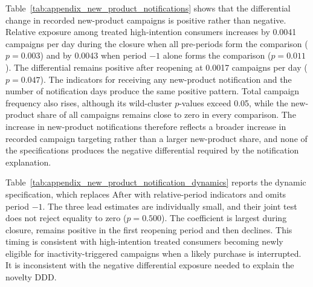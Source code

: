 \documentclass[11 pt]{article}
\begin{document}
Table~\ref{tab:appendix_new_product_notifications} shows that the differential change in recorded new-product campaigns is positive rather than negative. Relative exposure among treated high-intention consumers increases by 0.0041 campaigns per day during the closure when all pre-periods form the comparison ($p=0.003$) and by 0.0043 when period $-1$ alone forms the comparison ($p=0.011$). The differential remains positive after reopening at 0.0017 campaigns per day ($p=0.047$). The indicators for receiving any new-product notification and the number of notification days produce the same positive pattern. Total campaign frequency also rises, although its wild-cluster $p$-values exceed 0.05, while the new-product share of all campaigns remains close to zero in every comparison. The increase in new-product notifications therefore reflects a broader increase in recorded campaign targeting rather than a larger new-product share, and none of the specifications produces the negative differential required by the notification explanation.

Table~\ref{tab:appendix_new_product_notification_dynamics} reports the dynamic specification, which replaces $\text{After}$ with relative-period indicators and omits period $-1$. The three lead estimates are individually small, and their joint test does not reject equality to zero ($p=0.500$). The coefficient is largest during closure, remains positive in the first reopening period and then declines. This timing is consistent with high-intention treated consumers becoming newly eligible for inactivity-triggered campaigns when a likely purchase is interrupted. It is inconsistent with the negative differential exposure needed to explain the novelty DDD.
\end{document}
